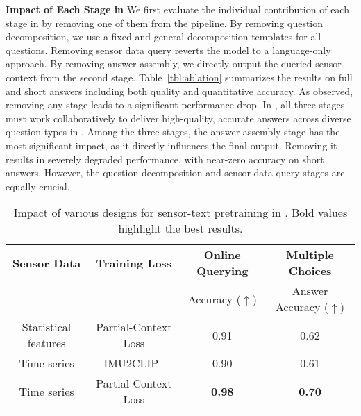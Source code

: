 \textbf{Impact of Each Stage in \Method} 
We first evaluate the individual contribution of each stage in \Method by removing one of them from the pipeline. 
By removing question decomposition, we use a fixed and general decomposition templates for all questions. Removing sensor data query reverts the model to a language-only approach. By removing answer assembly, we directly output the queried sensor context from the second stage.
Table~\ref{tbl:ablation} summarizes the results on full and short answers including both quality and quantitative accuracy.
As observed, removing any stage leads to a significant performance drop. 
In \Method, all three stages must work collaboratively to deliver high-quality, accurate answers across diverse question types in \Dataset.
Among the three stages, the answer assembly stage has the most significant impact, as it directly influences the final output. Removing it results in severely degraded performance, with near-zero accuracy on short answers. However, the question decomposition and sensor data query stages are equally crucial.


\begin{table}[!t]
\small
\centering
\caption{Impact of various designs for sensor-text pretraining in \MethodC. Bold values highlight the best results.}
\vspace{-4mm}
\label{tbl:ablation-sensor-feature}
\begin{tabular}{c|c|c|c} 
\toprule
\small
\textbf{Sensor Data} & \textbf{Training Loss} & \textbf{Online Querying} & \textbf{Multiple Choices} \\ 
& & Accuracy ($\uparrow$) & Answer Accuracy ($\uparrow$) \\
\midrule
Statistical features & Partial-Context Loss & 0.91 & 0.62 \\
Time series & IMU2CLIP~\cite{moon-etal-2023-imu2clip} & 0.90 & 0.61  \\ \midrule
Time series & Partial-Context Loss & \textbf{0.98} & \textbf{0.70} \\
\bottomrule
\end{tabular}
\vspace{-2mm}
\end{table}



